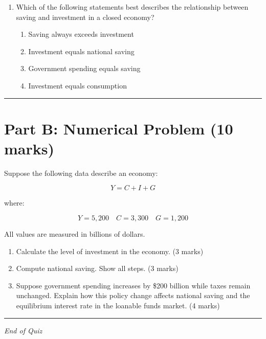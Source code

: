 \documentclass[12pt]{article}
\begin{document}
\begin{enumerate}[label=\textbf{\arabic*.}]
\item Which of the following statements best describes the relationship between saving and investment in a closed economy?
\begin{enumerate}[label=(\Alph*)]
\item Saving always exceeds investment  
\item Investment equals national saving  
\item Government spending equals saving  
\item Investment equals consumption  
\end{enumerate}

\end{enumerate}

\hrule
\vspace{1em}

\section*{Part B: Numerical Problem (10 marks)}

Suppose the following data describe an economy:

\[
Y = C + I + G
\]

where:

\[
Y = 5{,}200 \quad
C = 3{,}300 \quad
G = 1{,}200
\]

All values are measured in billions of dollars.



\begin{enumerate}

\item[(a)] Calculate the level of investment in the economy. (3 marks)

\item[(b)] Compute national saving. Show all steps. (3 marks)

\item[(c)] Suppose government spending increases by \$200 billion while taxes remain unchanged.  
Explain how this policy change affects national saving and the equilibrium interest rate in the loanable funds market. (4 marks)

\end{enumerate}

\hrule
\vspace{1em}

\begin{center}
\textit{End of Quiz}
\end{center}
\end{document}
